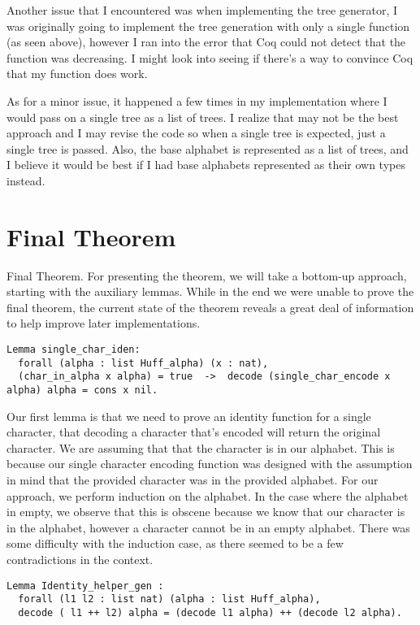 \documentclass{llncs}
\begin{document}
Another issue that I encountered was when implementing the tree generator, I was originally going to implement the tree generation with only a single function (as seen above), however I ran into the error that Coq could not detect that the function was decreasing. I might look into seeing if there’s a way to convince Coq that my function does work.


As for a minor issue,  it happened a few times in my implementation where I would pass on a single tree as a list of trees. I realize that may not be the best approach and I may revise the code so when a single tree is expected, just a single tree is passed. Also, the base alphabet is represented as a list of trees, and I believe it would be best if I had base alphabets represented as their own types instead.

\section{Final Theorem}

Final Theorem.
For presenting the theorem, we will take a bottom-up approach, starting with the auxiliary lemmas. While in the end we were unable to prove the final theorem, the current state of the theorem reveals a great deal of information to help improve later implementations.

\begin{lstlisting}
Lemma single_char_iden:
  forall (alpha : list Huff_alpha) (x : nat),
  (char_in_alpha x alpha) = true  ->  decode (single_char_encode x alpha) alpha = cons x nil.
\end{lstlisting}

Our first lemma is that we need to prove an identity function for a single character, that decoding a character that’s encoded will return the original character. We are assuming that that the character is in our alphabet. This is because our single character encoding function was designed with the assumption in mind that the provided character was in the provided alphabet. 
For our approach, we perform induction on the alphabet. In the case where the alphabet in empty, we observe that this is obscene because we know that our character is in the alphabet, however a character cannot be in an empty alphabet. 
There was some difficulty with the induction case, as there seemed to be a few contradictions in the context.

\begin{lstlisting}
Lemma Identity_helper_gen :
  forall (l1 l2 : list nat) (alpha : list Huff_alpha), 
  decode ( l1 ++ l2) alpha = (decode l1 alpha) ++ (decode l2 alpha).
\end{lstlisting}
\end{document}
